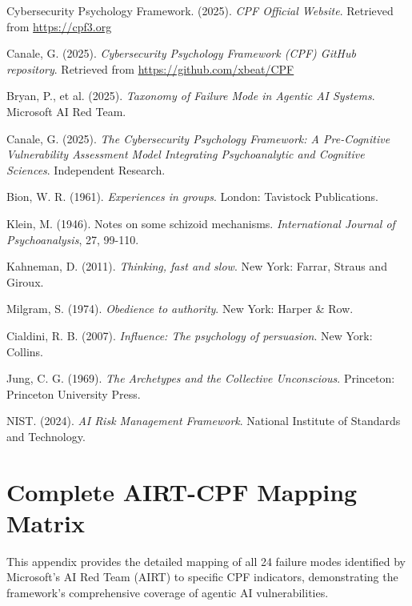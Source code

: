 \documentclass[11pt,a4paper]{article}
\begin{document}
\begin{thebibliography}{9}

Cybersecurity Psychology Framework. (2025). \textit{CPF Official Website}. 
Retrieved from \url{https://cpf3.org}

Canale, G. (2025). \textit{Cybersecurity Psychology Framework (CPF) GitHub repository}. 
Retrieved from \url{https://github.com/xbeat/CPF}

Bryan, P., et al. (2025). \textit{Taxonomy of Failure Mode in Agentic AI Systems}. Microsoft AI Red Team.

Canale, G. (2025). \textit{The Cybersecurity Psychology Framework: A Pre-Cognitive Vulnerability Assessment Model Integrating Psychoanalytic and Cognitive Sciences}. Independent Research.

Bion, W. R. (1961). \textit{Experiences in groups}. London: Tavistock Publications.

Klein, M. (1946). Notes on some schizoid mechanisms. \textit{International Journal of Psychoanalysis}, 27, 99-110.

Kahneman, D. (2011). \textit{Thinking, fast and slow}. New York: Farrar, Straus and Giroux.

Milgram, S. (1974). \textit{Obedience to authority}. New York: Harper \& Row.

Cialdini, R. B. (2007). \textit{Influence: The psychology of persuasion}. New York: Collins.

Jung, C. G. (1969). \textit{The Archetypes and the Collective Unconscious}. Princeton: Princeton University Press.

NIST. (2024). \textit{AI Risk Management Framework}. National Institute of Standards and Technology.

\end{thebibliography}

\appendix

\section{Complete AIRT-CPF Mapping Matrix}
\label{app:mapping}

This appendix provides the detailed mapping of all 24 failure modes identified by Microsoft's AI Red Team (AIRT) to specific CPF indicators, demonstrating the framework's comprehensive coverage of agentic AI vulnerabilities.
\end{document}
